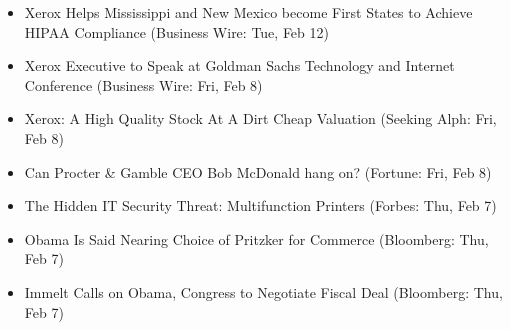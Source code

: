 \documentclass[11pt,asymmetric]{article}
\begin{document}
\begin{itemize}
\item Xerox Helps Mississippi and New Mexico become First States to Achieve HIPAA Compliance (Business Wire: Tue, Feb 12)
\item Xerox Executive to Speak at Goldman Sachs Technology and Internet Conference (Business Wire: Fri, Feb 8)
\item Xerox: A High Quality Stock At A Dirt Cheap Valuation (Seeking Alph: Fri, Feb 8)
\item Can Procter \& Gamble CEO Bob McDonald hang on? (Fortune: Fri, Feb 8)
\item The Hidden IT Security Threat: Multifunction Printers (Forbes: Thu, Feb 7)
\item Obama Is Said Nearing Choice of Pritzker for Commerce (Bloomberg: Thu, Feb 7)
\item Immelt Calls on Obama, Congress to Negotiate Fiscal Deal (Bloomberg: Thu, Feb 7)
\end{itemize}
\end{document}
